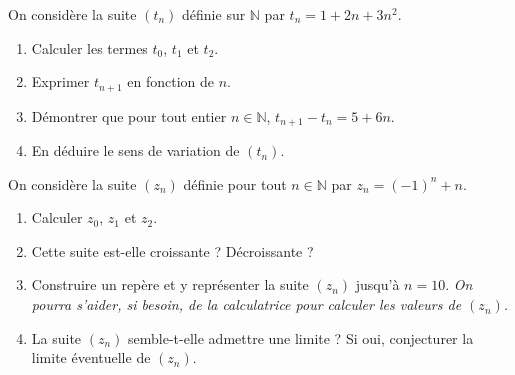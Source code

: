 \documentclass[11pt]{article}
\begin{document}
\begin{exo}[$3$ points]
  On considère la suite $(t_n)$ définie sur $\mathbb{N}$ par
  $t_n=1+2n+3n^2$.
  \begin{enumerate}
    \item Calculer les termes $t_0$, $t_1$ et $t_2$.
    \item Exprimer $t_{n+1}$ en fonction de $n$.
    \item Démontrer que pour tout entier $n\in\mathbb{N}$,
      $t_{n+1}-t_n=5+6n$.
    \item En déduire le sens de variation de $(t_n)$.
  \end{enumerate}
\end{exo}

\begin{exo}[$2$ points]
  On considère la suite $(z_n)$ définie pour tout $n\in\mathbb{N}$ par
  $z_n=(-1)^n+n$.
  \begin{enumerate}
    \item Calculer $z_0$, $z_1$ et $z_2$.
    \item Cette suite est-elle croissante ? Décroissante ?
    \item Construire un repère et y représenter la suite $(z_n)$ jusqu'à $n=10$.
      \emph{On pourra s'aider, si besoin, de la calculatrice pour calculer les
        valeurs de $(z_n)$.}
    \item La suite $(z_n)$ semble-t-elle admettre une limite ? Si oui,
      conjecturer la limite éventuelle de $(z_n)$.
  \end{enumerate}
\end{exo}
\end{document}
